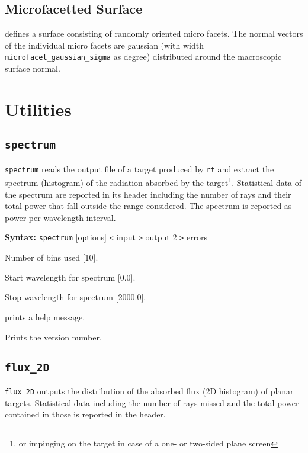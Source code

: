 \documentclass[10pt,a4paper,titlepage]{article}
\newcommand{\rt}{{\tt rt} }
\begin{document}
\subsection{Microfacetted Surface}

 defines a surface consisting of randomly oriented micro facets. The normal vectors of the individual micro facets are gaussian (with width {\tt microfacet\_gaussian\_sigma} as degree) distributed around the macroscopic surface normal.



\section{Utilities}
\subsection{{\tt spectrum}}

{\tt spectrum} reads the output file of a target produced by \rt and extract the spectrum (histogram) of the radiation absorbed by the target\footnote{or impinging on the target in case of a one- or two-sided plane screen}. Statistical data of the spectrum are reported in its header including the number of rays and their total power that fall outside the range considered. The spectrum is reported as power per wavelength interval.

{\bf Syntax:} {\tt spectrum} [options] {\tt <} input {\tt >} output 2 {\tt >} errors
\vspace{1em}
\begin{list}{}
{\setlength{\leftmargin}{3.5cm}
\setlength{\labelwidth}{3.0cm}
\setlength{\labelsep}{0.25cm}
\setlength{\rightmargin}{0.5cm}}

\item[{\tt [--num|-n]}] Number of bins used [10].
\item[{\tt [--start|-a]}] Start wavelength for spectrum [0.0].
\item[{\tt [--stop|-o]}] Stop wavelength for spectrum [2000.0].
\item[{\tt [--help|-h]}] prints a help message.
\item[{\tt [--Version|-V]}] Prints the version number.

\end{list}

\subsection{{\tt flux\_2D}}
{\tt flux\_2D} outputs the distribution of the absorbed flux (2D histogram) of planar targets. Statistical data including the number of rays missed and the total power contained in those is reported in the header.
\end{document}
